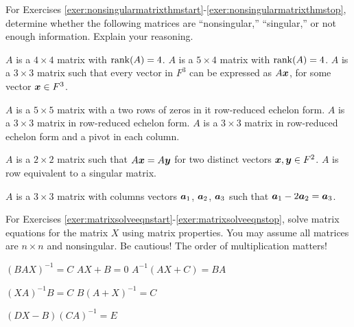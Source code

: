 \noindent For Exercises \ref{exer:nonsingularmatrixthmstart}-\ref{exer:nonsingularmatrixthmstop}, determine whether the following matrices are ``nonsingular,'' ``singular,'' or not enough information. Explain your reasoning.
\begin{enumerate}[!HW!, label=$\spadesuit$ \arabic*., ref=\arabic*]
\begin{multicols}{3}
\item\label{exer:nonsingularmatrixthmstart} $A$ is a  $4\times 4$ matrix with $\operatorname*{rank}(A)=4$.\columnbreak
\itemspade $A$ is a  $5\times 4$ matrix with $\operatorname*{rank}(A)=4$.\columnbreak
\itemspade $A$ is a  $3\times 3$ matrix such that every vector in $F^3$ can be expressed as $A\boldsymbol x$, for some vector $\boldsymbol x\in F^3$. 
\end{multicols}\vspace{-15 pt}
\begin{multicols}{3}
\itemspade $A$ is a $5\times 5$ matrix with a two rows of zeros in it row-reduced echelon form.
\itemspade $A$ is a $3\times 3$ matrix in row-reduced echelon form.
\itemspade $A$ is a $3\times 3$ matrix in row-reduced echelon form and a pivot in each column.
\end{multicols}\vspace{-15 pt}
\begin{multicols}{3}
\itemspade $A$ is a $2\times 2$ matrix such that $A\boldsymbol x=A\boldsymbol y$ for two distinct vectors $\boldsymbol x, \boldsymbol y\in F^2$.
\itemspade $A$ is row equivalent to a singular matrix.
\item \label{exer:nonsingularmatrixthmstop} $A$ is a $3\times 3$ matrix with columns vectors $\boldsymbol a_1$, $\boldsymbol a_2$, $\boldsymbol a_3$ such that $\boldsymbol a_1 - 2\boldsymbol a_2 = \boldsymbol a_3$.
\end{multicols}
\end{enumerate}

\noindent For Exercises \ref{exer:matrixsolveeqnstart}-\ref{exer:matrixsolveeqnstop}, solve matrix equations for the matrix $X$ using matrix properties. You may assume all matrices are $n\times n$ and nonsingular. Be cautious! The order of multiplication matters!
\begin{enumerate}[!HW!]
\begin{multicols}{3}
\item\label{exer:matrixsolveeqnstart} $(BAX)^{-1} = C$  %
\itemspade $AX+B=0$ 
\itemspade $A^{-1}(AX+C) = BA$
\end{multicols}
\begin{multicols}{3}
\itemspade $(XA)^{-1}B = C$
\itemspade $B(A+X)^{-1} = C$
\item\label{exer:matrixsolveeqnstop} $(DX-B)(CA)^{-1}=E$ %
\end{multicols}
\end{enumerate}

